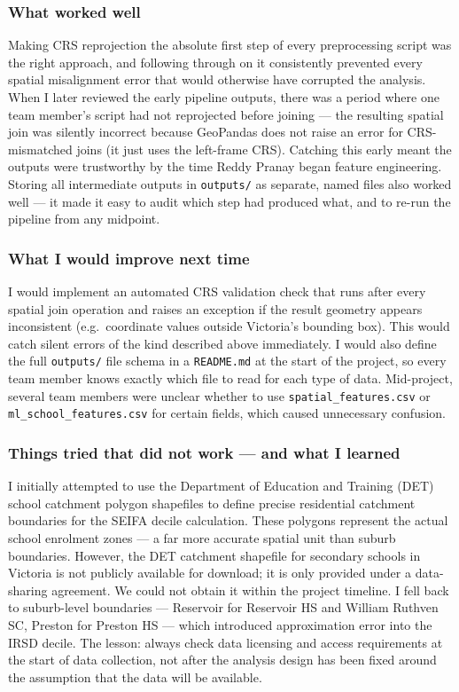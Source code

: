 \documentclass[11pt,a4paper]{article}
\begin{document}
\subsubsection*{What worked well}
Making CRS reprojection the absolute first step of every preprocessing script was the right approach, and following through on it consistently prevented every spatial misalignment error that would otherwise have corrupted the analysis. When I later reviewed the early pipeline outputs, there was a period where one team member's script had not reprojected before joining — the resulting spatial join was silently incorrect because GeoPandas does not raise an error for CRS-mismatched joins (it just uses the left-frame CRS). Catching this early meant the outputs were trustworthy by the time Reddy Pranay began feature engineering. Storing all intermediate outputs in \texttt{outputs/} as separate, named files also worked well — it made it easy to audit which step had produced what, and to re-run the pipeline from any midpoint.

\subsubsection*{What I would improve next time}
I would implement an automated CRS validation check that runs after every spatial join operation and raises an exception if the result geometry appears inconsistent (e.g.\ coordinate values outside Victoria's bounding box). This would catch silent errors of the kind described above immediately. I would also define the full \texttt{outputs/} file schema in a \texttt{README.md} at the start of the project, so every team member knows exactly which file to read for each type of data. Mid-project, several team members were unclear whether to use \texttt{spatial\_features.csv} or \texttt{ml\_school\_features.csv} for certain fields, which caused unnecessary confusion.

\subsubsection*{Things tried that did not work — and what I learned}
I initially attempted to use the Department of Education and Training (DET) school catchment polygon shapefiles to define precise residential catchment boundaries for the SEIFA decile calculation. These polygons represent the actual school enrolment zones — a far more accurate spatial unit than suburb boundaries. However, the DET catchment shapefile for secondary schools in Victoria is not publicly available for download; it is only provided under a data-sharing agreement. We could not obtain it within the project timeline. I fell back to suburb-level boundaries — Reservoir for Reservoir HS and William Ruthven SC, Preston for Preston HS — which introduced approximation error into the IRSD decile. The lesson: always check data licensing and access requirements at the start of data collection, not after the analysis design has been fixed around the assumption that the data will be available.
\end{document}
